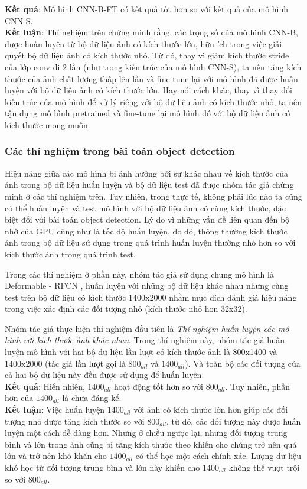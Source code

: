 {    \noindent
    \textbf{Kết quả}:
    Mô hình CNN-B-FT có kết quả tốt hơn so với kết quả của mô hình CNN-S. \\
    \textbf{Kết luận}:
    Thí nghiệm trên chứng minh rằng, các trọng số của mô hình CNN-B, được huấn luyện từ bộ dữ liệu ảnh có kích thước lớn, hữu ích trong việc giải quyết bộ dữ liệu ảnh có kích thước nhỏ.
    Từ đó, thay vì giảm kích thước stride của lớp conv đi 2 lần (như trong kiến trúc của mô hình CNN-S), ta nên tăng kích thước của ảnh chất lượng thấp lên lần và fine-tune lại với mô hình đã được huấn luyện với bộ dữ liệu ảnh có kích thước lớn.
    Hay nói cách khác, thay vì thay đổi kiến trúc của mô hình để xử lý riêng với bộ dữ liệu ảnh có kích thước nhỏ, ta nên tận dụng mô hình pretrained và fine-tune lại mô hình đó với bộ dữ liệu ảnh có kích thước mong muốn.

    \subsubsection*{Các thí nghiệm trong bài toán object detection}
    Hiệu năng giữa các mô hình bị ảnh hưởng bởi sự khác nhau về kích thước của ảnh trong bộ dữ liệu huấn luyện và bộ dữ liệu test đã được nhóm tác giả chứng minh ở các thí nghiệm trên.
    Tuy nhiên, trong thực tế, không phải lúc nào ta cũng có thể huấn luyện và test mô hình với bộ dữ liệu ảnh có cùng kích thước, đặc biệt đối với bài toán object detection.
    Lý do vì những vấn đề liên quan đến bộ nhớ của GPU cũng như là tốc độ huấn luyện, do đó, thông thường kích thước ảnh trong bộ dữ liệu sử dụng trong quá trình huấn luyện thường nhỏ hơn so với kích thước ảnh trong quá trình test.

    \noindent
    Trong các thí nghiệm ở phần này, nhóm tác giả sử dụng chung mô hình là Deformable - RFCN \cite{dai2017deformable}, huấn luyện với những bộ dữ liệu khác nhau nhưng cùng test trên bộ dữ liệu có kích thước 1400x2000 nhằm mục đích đánh giá hiệu năng trong việc xác định các đối tượng nhỏ (kích thước nhỏ hơn 32x32).

    \noindent
    Nhóm tác giả thực hiện thí nghiệm đầu tiên là \textit{Thí nghiệm huấn luyện các mô hình với kích thước ảnh khác nhau}.
    Trong thí nghiệm này, nhóm tác giả huấn luyện mô hình với hai bộ dữ liệu lần lượt có kích thước ảnh là 800x1400 và 1400x2000 (tác giả lần lượt gọi là ${800}_{all}$ và ${1400}_{all}$).
    Và toàn bộ các đối tượng của cả hai bộ dữ liệu này đều được sử dụng để huấn luyện. \\
    \textbf{Kết quả}:
    Hiển nhiên, ${1400}_{all}$ hoạt động tốt hơn so với ${800}_{all}$.
    Tuy nhiên, phần hơn của ${1400}_{all}$ là chưa đáng kể. \\
    \textbf{Kết luận}:
    Việc huấn luyện ${1400}_{all}$ với ảnh có kích thước lớn hơn giúp các đối tượng nhỏ được tăng kích thước so với ${800}_{all}$, từ đó, các đối tượng này được huấn luyện một cách dễ dàng hơn.
    Nhưng ở chiều ngược lại, những đối tượng trung bình và lớn trong ảnh cũng bị tăng kích thước theo khiến cho chúng trở nên quá lớn và trở nên khó khăn cho ${1400}_{all}$ có thể học một cách chính xác.
    Lượng dữ liệu khó học từ đối tượng trung bình và lớn này khiến cho ${1400}_{all}$ không thể vượt trội so với ${800}_{all}$.

}

